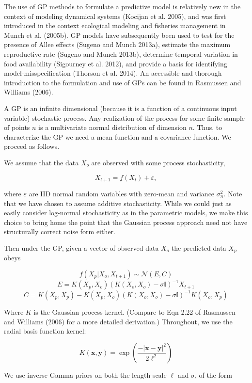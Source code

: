 \documentclass[author-year, 12pt,review]{components/elsarticle} %
\begin{document}
The use of GP methods to formulate a predictive model is relatively new
in the context of modeling dynamical systems (Kocijan et al. 2005), and
was first introduced in the context ecological modeling and fisheries
management in Munch et al. (2005b). GP models have subsequently been
used to test for the presence of Allee effects (Sugeno and Munch 2013a),
estimate the maximum reproductive rate (Sugeno and Munch 2013b),
determine temporal variation in food availability (Sigourney et al.
2012), and provide a basis for identifying model-misspecification
(Thorson et al. 2014). An accessible and thorough introduction to the
formulation and use of GPs can be found in Rasmussen and Williams
(2006).

A GP is an infinite dimensional (because it is a function of a
continuous input variable) stochastic process. Any realization of the
process for some finite sample of points $n$ is a multivariate normal
distribution of dimension $n$. Thus, to characterize the GP we need a
mean function and a covariance function. We proceed as follows.

We assume that the data $X_o$ are observed with some process
stochasticity,

\[X_{t+1} = f(X_t) + \varepsilon,\]

where $\varepsilon$ are IID normal random variables with zero-mean and
variance $\sigma_n^2$. Note that we have chosen to assume additive
stochasticity. While we could just as easily consider log-normal
stochasticity as in the parametric models, we make this choice to bring
home the point that the Gaussian process approach need not have
structurally correct noise form either.

Then under the GP, given a vector of observed data $X_o$ the predicted
data $X_p$ obeys

\[f(X_p|X_o, X_{t+1}) \sim \mathcal{N}(E,C)\]
\[E = K(X_p, X_o) \left(K(X_o,X_o) - \sigma \mathbb{I} \right)^{-1} X_{t+1}\]
\[C = K(X_p, X_p) - K(X_p, X_o) \left(K(X_o,X_o) - \sigma \mathbb{I} \right)^{-1} K(X_o, X_p)\]

Where $K$ is the Gaussian process kernel. (Compare to Eqn 2.22 of
Rasmussen and Williams (2006) for a more detailed derivation.)
Throughout, we use the radial basis function kernel:

\[ K(\mathbf{x},\mathbf{y}) = \exp\left(\frac{-|\mathbf{x}-\mathbf{y}|^2}{2 \ell^2} \right)\]

We use inverse Gamma priors on both the length-scale $\ell$ and
$\sigma$, of the form
\end{document}
